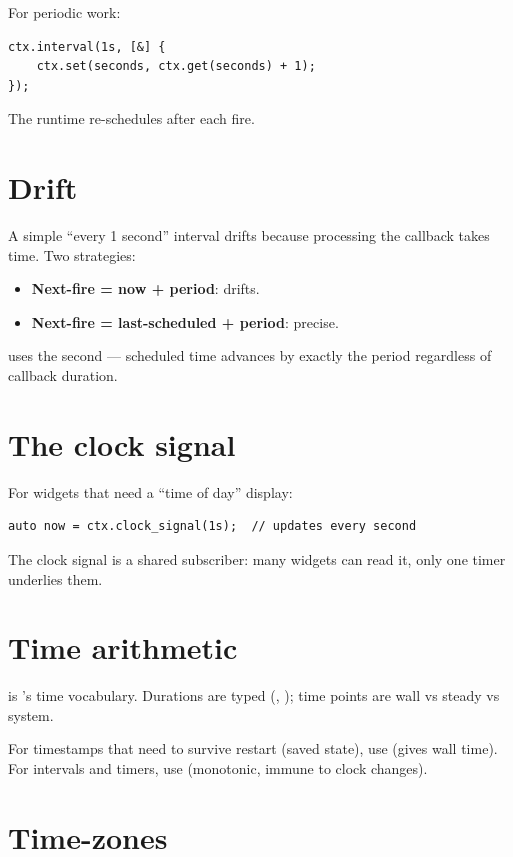 For periodic work:

\begin{lstlisting}
ctx.interval(1s, [&] {
    ctx.set(seconds, ctx.get(seconds) + 1);
});
\end{lstlisting}

The runtime re-schedules after each fire.

\section{Drift}

A simple ``every 1 second'' interval drifts because
processing the callback takes time. Two strategies:

\begin{itemize}[leftmargin=*]
  \item \textbf{Next-fire = now + period}: drifts.
  \item \textbf{Next-fire = last-scheduled + period}: precise.
\end{itemize}

\maya{} uses the second --- scheduled time advances by
exactly the period regardless of callback duration.

\section{The clock signal}

For widgets that need a ``time of day'' display:

\begin{lstlisting}
auto now = ctx.clock_signal(1s);  // updates every second
\end{lstlisting}

The clock signal is a shared subscriber: many widgets can
read it, only one timer underlies them.

\section{Time arithmetic}

 is \maya{}'s time vocabulary. Durations
are typed (, ); time points
are wall vs steady vs system.

For timestamps that need to survive restart (saved state),
use  (gives wall time). For intervals
and timers, use  (monotonic, immune to
clock changes).

\section{Time-zones}

